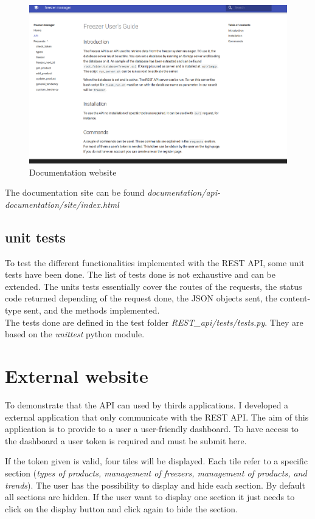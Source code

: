\begin{figure}[H]
\centering
\includegraphics[scale=0.25]{./images/documentation.png}
\caption{Documentation website}
\label{fig:adminPanel}
\end{figure}

The documentation site can be found \textit{documentation/api-documentation/site/index.html}

\subsection{unit tests}
To test the different functionalities implemented with the REST API, some unit tests have been done. The list of tests done is not exhaustive and can be extended. The units tests essentially cover the routes of the requests, the status code returned depending of the request done, the JSON objects sent, the content-type sent, and the methods implemented.\\

The tests done are defined in the test folder \textit{REST\_api/tests/tests.py}. They are based on the \textit{unittest} python module.

\section{External website}
To demonstrate that the API can used by thirds applications. I developed a external application that only communicate with the REST API. The aim of this application is to provide to a user a user-friendly dashboard. To have access to the dashboard a user token is required and must be submit here.


If the token given is valid, four tiles will be displayed. Each tile refer to a specific section (\textit{types of products, management of freezers, management of products, and trends}). The user has the possibility to display and hide each section. By default all sections are hidden. If the user want to display one section it just needs to click on the display button and click again to hide the section.

